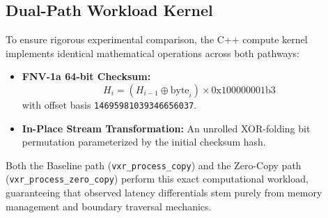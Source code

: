\subsection{Dual-Path Workload Kernel}
To ensure rigorous experimental comparison, the C++ compute kernel implements identical mathematical operations across both pathways:
\begin{itemize}
    \item \textbf{FNV-1a 64-bit Checksum:}
    \begin{equation}
    H_{i} = (H_{i-1} \oplus \text{byte}_i) \times \text{0x100000001b3}
    \end{equation}
    with offset basis \texttt{14695981039346656037}.
    \item \textbf{In-Place Stream Transformation:} An unrolled XOR-folding bit permutation parameterized by the initial checksum hash.
\end{itemize}
Both the Baseline path (\texttt{vxr\_process\_copy}) and the Zero-Copy path (\texttt{vxr\_process\_zero_copy}) perform this exact computational workload, guaranteeing that observed latency differentials stem purely from memory management and boundary traversal mechanics.

